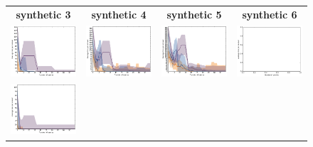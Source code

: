 \documentclass{article}
\renewcommand\[{\begin{equation}}
\renewcommand\]{\end{equation}}
\begin{document}
\begin{figure}[b]
    \centering
    \begin{tabular}{cccc}
        {\bf synthetic 3} & {\bf synthetic 4} & {\bf synthetic 5} & {\bf synthetic 6}
        \\
        \includegraphics[width=12em]{figures/synthetic_3_uniform_cv5_loss} &
        \includegraphics[width=12em]{figures/synthetic_4_uniform_cv5_loss} &
        \includegraphics[width=12em]{figures/synthetic_5_uniform_cv5_loss} &
        \includegraphics[width=12em]{figures/synthetic_6_uniform_cv5_loss}
        \\
        \includegraphics[width=12em]{figures/synthetic_3_uniform_sparse_cv5_loss} &

\end{tabular}
\end{figure}
\end{document}
